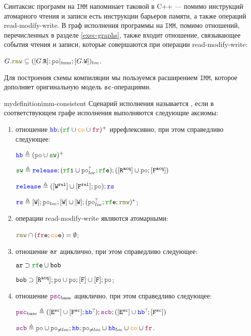 \documentclass[14pt]{matmex-diploma-custom}
\newcommand{\IMM}{\mathtt{IMM}}
\begin{document}
Синтаксис программ на $\IMM$ напоминает таковой в C++ --- помимо инструкций атомарного чтения и записи есть инструкции барьеров памяти, а также операций read-modify-write. В граф исполнения программы на $\IMM$, помимо отношений, перечисленных в разделе \ref{exec-graphs}, также входит отношение, связывающее события чтения и записи, которые совершаются при операции read-modify-write:

$G.\lRMW \subseteq ([G.\lR] ;\imm \lPO;[G.\lW])_{loc}$. 

Для построения схемы компиляции мы пользуемся расширением \cite{imm-sc} $\IMM$, которое дополняет оригинальную модель \cite{imm} ${\mathtt{sc}}$-операциями. 

\begin{restatable}{mydefinition}{imm-consistent}
  Сценарий исполнения называется \term{согласованным по $\IMM$}, если в соответствующем графе исполнения выполняются следующие аксиомы:
  \begin{enumerate}
  \item отношение $\lHB ; (\lRF \cup \lCO \cup \lFR)^{+}$ иррефлексивно, при этом справедливо следующее:
    
  $\lHB \defeq (\lPO \cup \lSW)^{+}$

  $\lSW \defeq \mathtt{\color{blue}release};(\lRFI \cup \lPO^?_{loc};\lRFE);([\lR^{\acq}] \cup \lPO;[\lF^{\acq}])$

  $\mathtt{\color{blue}release} \defeq ([\lW^{\rel}] \cup [\lF^{\rel}];\lPO);\mathtt{\color{blue}rs}$

  $\mathtt{\color{blue}rs} \defeq [\lW];\lPO_{loc};[\lW] \cup [\lW];(\lPO^?_{loc};\lRFE;\lRMW)^{*}$;
\item операции read-modify-write являются атомарными:

  $\lRMW \cap (\lFRE ; \lCOE) = \emptyset$;
  \item отношение $\lAR$ ациклично, при этом справедливо следующее:

    $\lAR \supset \lRFE \cup \lBOB$

    $\lBOB \supset [\lR^{\acq}] ; \lPO \cup \lPO ; [\lF] \cup [\lF] ; \lPO$;
  \item отношение $\lPSCB$ ациклично, при этом справедливо следующее:

    $\lPSCB \defeq ([\lE^\sco] \cup{} [\lF^\sco];\lHB^?);\lSCB;([\lE^\sco] \cup{} \lHB^?;[\lF^\sco])$

    $\lSCB \defeq \lPO \cup \lPO_{\neq loc} ; \lHB ; \lPO_{\neq loc} \cup \lHB_{loc} \cup \lCO \cup \lFR$.

  \end{enumerate}
\end{restatable}
\end{document}
